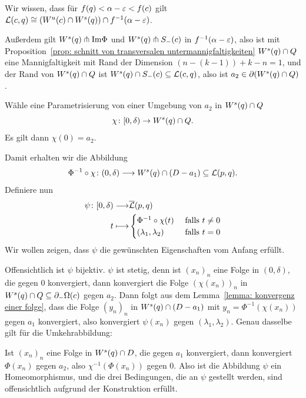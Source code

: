 \begin{bigproof}
    Wir wissen, dass für $f(q) < \alpha - \varepsilon < f(c)$ gilt 
    ${ \mathcal{L} } (c, q) \cong ({ W^u } (c) \cap { W^s } (q)) \cap f^{-1}(\alpha - \varepsilon)$. 
    
    Außerdem gilt ${ W^s } (q) \pitchfork { \operatorname{Im} } \Phi$ und ${ W^s } (q) \pitchfork S_-(c)$ in 
    $f^{-1}(\alpha - \varepsilon)$, also ist mit 
    Proposition~\ref{prop: schnitt von transversalen untermannigfaltigkeiten}
    ${ W^s } (q) \cap Q$ eine Mannigfaltigkeit mit Rand der Dimension $(n - (k - 1)) + k - n = 1$,
    und der Rand von ${ W^s } (q) \cap Q$ ist ${ W^s } (q) \cap S_-(c) \subseteq { \mathcal{L} } (c, q)$, also ist 
    $a_2 \in { \partial } ({ W^s }(q) \cap Q)$.

    Wähle eine Parametrisierung von einer Umgebung von $a_2$ in ${ W^s } (q) \cap Q$
    \[ \chi \colon [0, \delta) \to { W^s } (q) \cap Q . \]
    Es gilt dann $\chi(0) = a_2$.
    
    Damit erhalten wir die Abbildung 
    \[ \Phi^{-1} \circ \chi \colon (0, \delta) \longrightarrow { W^s } (q) \cap (D - a_1) \subseteq { \mathcal{L} } (p, q) . \]
    Definiere nun 
    \begin{align*} 
        \psi \colon [0, \delta) \longrightarrow & {\overline{\mathcal{L}} } (p, q) \\
        t \longmapsto & \begin{cases}
            \Phi^{-1} \circ \chi (t) & \text{ falls } t \neq 0 \\
            (\lambda_1, \lambda_2) & \text{ falls } t = 0
        \end{cases}
    \end{align*}
    Wir wollen zeigen, dass $\psi$ die gewünschten Eigenschaften vom Anfang erfüllt.

    Offensichtlich ist $\psi$ bijektiv. $\psi$ ist stetig, denn ist $(x_n)_n$ eine Folge in 
    $(0, \delta)$, die gegen $0$ konvergiert, dann konvergiert die Folge $(\chi(x_n))_n$ in 
    ${ W^s } (q) \cap Q \subseteq { \partial }_- \Omega (c)$ gegen $a_2$. Dann folgt aus dem 
    Lemma~\ref{lemma: konvergenz einer folge}, dass die  Folge $(y_n)_n$ in ${ W^s } (q) \cap (D - a_1)$
    mit $y_n = \Phi^{-1}(\chi(x_n))$ gegen $a_1$ konvergiert, also konvergiert $\psi(x_n)$ gegen
    $(\lambda_1, \lambda_2)$. Genau dasselbe gilt für die Umkehrabbildung:

    Ist $(x_n)_n$ eine Folge in ${ W^s } (q) \cap D$, die gegen $a_1$ konvergiert, dann konvergiert
    $\Phi (x_n)$ gegen $a_2$, also $\chi^{-1} (\Phi(x_n))$ gegen $0$.
    Also ist die Abbildung $\psi$ ein Homeomorphismus, und die drei Bedingungen, die an $\psi$ gestellt
    werden, sind offensichtlich aufgrund der Konstruktion erfüllt. 


\end{bigproof}
